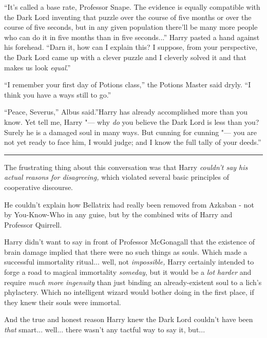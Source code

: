 ``It's called a base rate, Professor Snape. The evidence is equally
compatible with the Dark Lord inventing that puzzle over the course of
five months or over the course of five seconds, but in any given
population there'll be many more people who can do it in five months
than in five seconds...'' Harry pasted a hand against his forehead.
``Darn it, how can I explain this? I suppose, from your perspective, the
Dark Lord came up with a clever puzzle and I cleverly solved it and that
makes us look \emph{equal}.''

``I remember your first day of Potions class,'' the Potions Master said
dryly. ``I think you have a ways still to go.''

``Peace, Severus,'' Albus said.''Harry has already accomplished more
than you know. Yet tell me, Harry "--- why \emph{do} you believe the Dark
Lord is less than you? Surely he is a damaged soul in many ways. But
cunning for cunning "--- you are not yet ready to face him, I would judge;
and I know the full tally of your deeds.''

\begin{center}\rule{3in}{0.4pt}\end{center}

The frustrating thing about this conversation was that Harry
\emph{couldn't say his actual reasons for disagreeing,} which violated
several basic principles of cooperative discourse.

He couldn't explain how Bellatrix had really been removed from Azkaban -
not by You-Know-Who in any guise, but by the combined wits of Harry and
Professor Quirrell.

Harry didn't want to say in front of Professor McGonagall that the
existence of brain damage implied that there were no such things as
souls. Which made a successful immortality ritual... well, not
\emph{impossible,} Harry certainly intended to forge a road to magical
immortality \emph{someday}, but it would be a \emph{lot harder} and
require \emph{much more ingenuity} than just binding an already-existent
soul to a lich's phylactery. Which no intelligent wizard would bother
doing in the first place, if they knew their souls were immortal.

And the true and honest reason Harry knew the Dark Lord couldn't have
been \emph{that} smart... well... there wasn't any tactful way
to say it, but...

